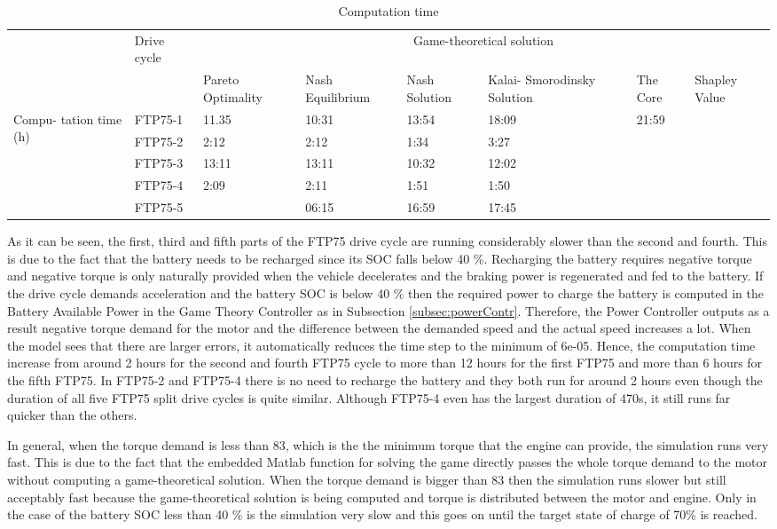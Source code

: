 \begin{table}[h]
\centering
\begin{tabular}{ |p{1.5cm}|p{1.5cm}|p{1.3cm}|p{1.3cm}|p{1.3cm}|p{1.3cm}|p{1.3cm}|p{1.3cm}|} 
 \hline
  \cline{3-8}
   & Drive cycle & \multicolumn{6}{|c|}{Game-theoretical solution} \\
   \cline{3-8}
   & & Pareto Optimality & Nash Equilibrium & Nash Solution & Kalai- Smorodinsky Solution & The Core & Shapley Value\\
 \hline\hline
 \multirow{5}{*}{\parbox{1.5cm}{Compu- tation time (h)}} 
 & FTP75-1 & 11.35 & 10:31 & 13:54 & 18:09 & 21:59 & \\ 
 & FTP75-2 & 2:12 & 2:12 & 1:34 & 3:27 & & \\ 
 & FTP75-3 & 13:11 & 13:11 & 10:32 & 12:02 & & \\ 
 & FTP75-4 & 2:09 & 2:11 & 1:51 & 1:50 & & \\ 
 & FTP75-5 & & 06:15 & 16:59 & 17:45 & & \\ 
 \hline
\end{tabular}
\caption{Computation time}
\label{tab:config}
\end{table}

As it can be seen, the first, third and fifth parts of the FTP75 drive cycle are running considerably slower than the second and fourth. This is due to the fact that the battery needs to be recharged since its SOC falls below 40 \%. Recharging the battery requires negative torque and negative torque is only naturally provided when the vehicle decelerates and the braking power is regenerated and fed to the battery. If the drive cycle demands acceleration and the battery SOC is below 40 \% then the required power to charge the battery is computed in the Battery Available Power in the Game Theory Controller as in Subsection \ref{subsec:powerContr}. Therefore, the Power Controller outputs as a result negative torque demand for the motor and the difference between the demanded speed and the actual speed increases a lot. When the model sees that there are larger errors, it automatically reduces the time step to the minimum of 6e-05. Hence, the computation time increase from around 2 hours for the second and fourth FTP75 cycle to more than 12 hours for the first FTP75 and more than 6 hours for the fifth FTP75. In FTP75-2 and FTP75-4 there is no need to recharge the battery and they both run for around 2 hours even though the duration of all five FTP75 split drive cycles is quite similar. Although FTP75-4 even has the largest duration of 470s, it still runs far quicker than the others.

In general, when the torque demand is less than 83, which is the the minimum torque that the engine can provide, the simulation runs very fast. This is due to the fact that the embedded Matlab function for solving the game directly passes the whole torque demand to the motor without computing a game-theoretical solution. When the torque demand is bigger than 83 then the simulation runs slower but still acceptably fast because the game-theoretical solution is being computed and torque is distributed between the motor and engine. Only in the case of the battery SOC less than 40 \% is the simulation very slow and this goes on until the target state of charge of 70\% is reached.